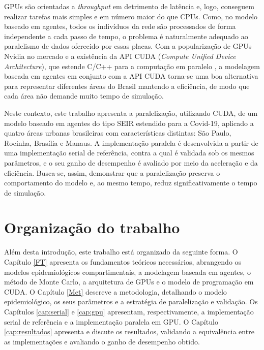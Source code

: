 GPUs são orientadas a \textit{throughput} em detrimento de latência e, logo, conseguem realizar tarefas mais simples e em número maior do que CPUs. Como, no modelo baseado em agentes, todos os indivíduos da rede são processados de forma independente a cada passo de tempo, o problema é naturalmente adequado ao paralelismo de dados oferecido por essas placas. Com a popularização de GPUs Nvidia no mercado e a existência da API CUDA (\textit{Compute Unified Device Architecture}), que estende C/C++ para a computação em paralelo \cite{sanders2011}, a modelagem baseada em agentes em conjunto com a API CUDA torna-se uma boa alternativa para representar diferentes áreas do Brasil mantendo a eficiência, de modo que cada área não demande muito tempo de simulação.

Neste contexto, este trabalho apresenta a paralelização, utilizando CUDA, de um modelo baseado em agentes do tipo SEIR estendido para a Covid-19, aplicado a quatro áreas urbanas brasileiras com características distintas: São Paulo, Rocinha, Brasília e Manaus. A implementação paralela é desenvolvida a partir de uma implementação serial de referência, contra a qual é validada sob os mesmos parâmetros, e o seu ganho de desempenho é avaliado por meio da aceleração e da eficiência. Busca-se, assim, demonstrar que a paralelização preserva o comportamento do modelo e, ao mesmo tempo, reduz significativamente o tempo de simulação.

\section{Organização do trabalho}

Além desta introdução, este trabalho está organizado da seguinte forma. O Capítulo \ref{FT} apresenta os fundamentos teóricos necessários, abrangendo os modelos epidemiológicos compartimentais, a modelagem baseada em agentes, o método de Monte Carlo, a arquitetura de GPUs e o modelo de programação em CUDA. O Capítulo \ref{Met} descreve a metodologia, detalhando o modelo epidemiológico, os seus parâmetros e a estratégia de paralelização e validação. Os Capítulos \ref{cap:serial} e \ref{cap:gpu} apresentam, respectivamente, a implementação serial de referência e a implementação paralela em GPU. O Capítulo \ref{cap:resultados} apresenta e discute os resultados, validando a equivalência entre as implementações e avaliando o ganho de desempenho obtido.
